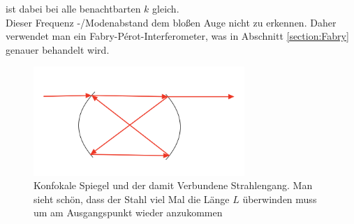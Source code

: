 ist dabei bei alle benachtbarten $k$ gleich.\\
Dieser Frequenz -/Modenabstand dem bloßen Auge nicht zu erkennen. Daher verwendet man ein Fabry-Pérot-Interferometer, was in Abschnitt \ref{section:Fabry} genauer behandelt wird.

\begin{figure}[ht]
    \centering
    \includegraphics[width = 8cm]{Bilder/Auswertung/KonfokalSpiegel.png}
    \caption{Konfokale Spiegel und der damit Verbundene Strahlengang. Man sieht schön, dass der Stahl viel Mal die Länge $L$ überwinden muss um am Ausgangspunkt wieder anzukommen}
    \label{bild:Konfokal}
\end{figure}